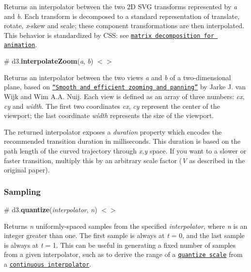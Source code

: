 Returns an interpolator between the two 2D S\+VG transforms represented by {\itshape a} and {\itshape b}. Each transform is decomposed to a standard representation of translate, rotate, {\itshape x}-\/skew and scale; these component transformations are then interpolated. This behavior is standardized by C\+SS\+: see \href{http://www.w3.org/TR/css3-2d-transforms/#matrix-decomposition}{\tt matrix decomposition for animation}.

\label{_interpolateZoom}%
\# d3.{\bfseries interpolate\+Zoom}({\itshape a}, {\itshape b}) \href{https://github.com/d3/d3-interpolate/blob/master/src/zoom.js}{\tt $<$$>$}

Returns an interpolator between the two views {\itshape a} and {\itshape b} of a two-\/dimensional plane, based on \href{http://www.win.tue.nl/~vanwijk/zoompan.pdf}{\tt “\+Smooth and efficient zooming and panning”} by Jarke J. van Wijk and Wim A.\+A. Nuij. Each view is defined as an array of three numbers\+: {\itshape cx}, {\itshape cy} and {\itshape width}. The first two coordinates {\itshape cx}, {\itshape cy} represent the center of the viewport; the last coordinate {\itshape width} represents the size of the viewport.

The returned interpolator exposes a {\itshape duration} property which encodes the recommended transition duration in milliseconds. This duration is based on the path length of the curved trajectory through {\itshape x,y} space. If you want to a slower or faster transition, multiply this by an arbitrary scale factor ({\itshape V} as described in the original paper).

\subsubsection*{Sampling}

\label{_quantize}%
\# d3.{\bfseries quantize}({\itshape interpolator}, {\itshape n}) \href{https://github.com/d3/d3-interpolate/blob/master/src/quantize.js}{\tt $<$$>$}

Returns {\itshape n} uniformly-\/spaced samples from the specified {\itshape interpolator}, where {\itshape n} is an integer greater than one. The first sample is always at {\itshape t} = 0, and the last sample is always at {\itshape t} = 1. This can be useful in generating a fixed number of samples from a given interpolator, such as to derive the range of a \href{https://github.com/d3/d3-scale#quantize-scales}{\tt quantize scale} from a \href{https://github.com/d3/d3-scale#interpolateWarm}{\tt continuous interpolator}.

